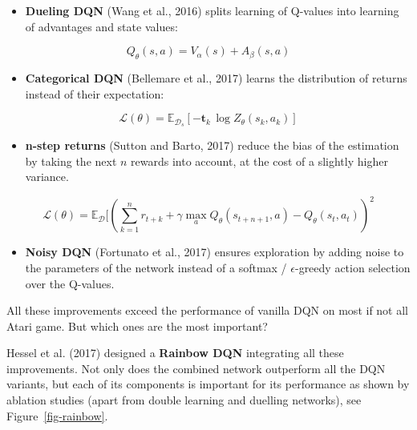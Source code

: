 \documentclass[
  letterpaper,
  DIV=11,
  numbers=noendperiod]{scrreprt}
\providecommand{\tightlist}{%
  \setlength{\itemsep}{0pt}\setlength{\parskip}{0pt}}\usepackage{longtable,booktabs,array}
\begin{document}
\begin{itemize}
\tightlist
\item
  \textbf{Dueling DQN} (Wang et al., 2016) splits learning of Q-values
  into learning of advantages and state values:
\end{itemize}

\[Q_\theta(s, a) = V_\alpha(s) + A_\beta(s, a)\]

\begin{itemize}
\tightlist
\item
  \textbf{Categorical DQN} (Bellemare et al., 2017) learns the
  distribution of returns instead of their expectation:
\end{itemize}

\[\mathcal{L}(\theta) = \mathbb{E}_{\mathcal{D}_s}[ - \mathbf{t}_k \, \log Z_\theta(s_k, a_k)]\]

\begin{itemize}
\tightlist
\item
  \textbf{n-step returns} (Sutton and Barto, 2017) reduce the bias of
  the estimation by taking the next \(n\) rewards into account, at the
  cost of a slightly higher variance.
\end{itemize}

\[\mathcal{L}(\theta) = \mathbb{E}_\mathcal{D} [(\sum_{k=1}^n r_{t+k} + \gamma \max_a Q_\theta(s_{t+n+1}, a) - Q_\theta(s_t, a_t))^2\]

\begin{itemize}
\tightlist
\item
  \textbf{Noisy DQN} (Fortunato et al., 2017) ensures exploration by
  adding noise to the parameters of the network instead of a softmax /
  \(\epsilon\)-greedy action selection over the Q-values.
\end{itemize}

All these improvements exceed the performance of vanilla DQN on most if
not all Atari game. But which ones are the most important?

Hessel et al. (2017) designed a \textbf{Rainbow DQN} integrating all
these improvements. Not only does the combined network outperform all
the DQN variants, but each of its components is important for its
performance as shown by ablation studies (apart from double learning and
duelling networks), see Figure~\ref{fig-rainbow}.
\end{document}
